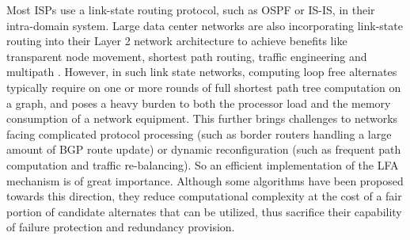 Most ISPs use a link-state routing protocol, such as OSPF or IS-IS, in their intra-domain system.
Large data center networks are also incorporating link-state routing into their Layer 2 network architecture
to achieve benefits like transparent node movement, shortest path routing, traffic engineering and multipath \cite{perlman2011introduction, TRILL}.
However, in such link state networks, computing loop free alternates typically require on one or more rounds
of full shortest path tree computation on a graph, and poses a heavy burden to both the processor load and
the memory consumption of a network equipment. This further brings challenges to networks
facing complicated protocol processing (such as border routers handling a large amount of BGP route update)
or dynamic reconfiguration (such as frequent path computation and traffic re-balancing).
So an efficient implementation of the LFA mechanism is of great importance. Although some algorithms \cite{TBFH, Geng2018A}
have been proposed towards this direction, they reduce computational complexity at the cost of
a fair portion of candidate alternates that can be utilized, thus sacrifice their capability of failure protection and
redundancy provision.

